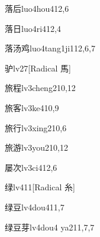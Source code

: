\begin{verbete}{落后}{luo4hou4}{12,6}
\end{verbete}

\begin{verbete}{落日}{luo4ri4}{12,4}
\end{verbete}

\begin{verbete}{落汤鸡}{luo4tang1ji1}{12,6,7}
\end{verbete}

\begin{verbete}{驴}{lv2}{7}[Radical 馬]
\end{verbete}

\begin{verbete}{旅程}{lv3cheng2}{10,12}
\end{verbete}

\begin{verbete}{旅客}{lv3ke4}{10,9}
\end{verbete}

\begin{verbete}{旅行}{lv3xing2}{10,6}
\end{verbete}

\begin{verbete}{旅游}{lv3you2}{10,12}
\end{verbete}

\begin{verbete}{屡次}{lv3ci4}{12,6}
\end{verbete}

\begin{verbete}{绿}{lv4}{11}[Radical 糸]
\end{verbete}

\begin{verbete}{绿豆}{lv4dou4}{11,7}
\end{verbete}

\begin{verbete}{绿豆芽}{lv4dou4 ya2}{11,7,7}
\end{verbete}


